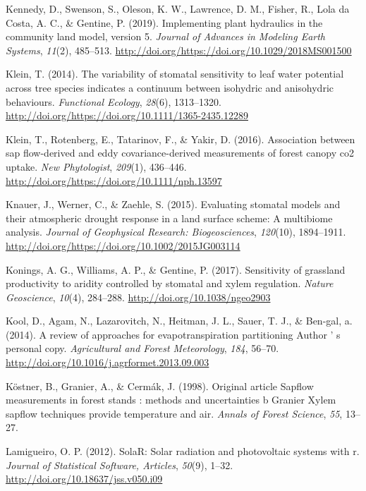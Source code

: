 \documentclass[11pt,twoside]{reedthesis}
\begin{document}
\hypertarget{ref-Kennedy2019}{}
Kennedy, D., Swenson, S., Oleson, K. W., Lawrence, D. M., Fisher, R.,
Lola da Costa, A. C., \& Gentine, P. (2019). Implementing plant
hydraulics in the community land model, version 5. \emph{Journal of
Advances in Modeling Earth Systems}, \emph{11}(2), 485--513.
\url{http://doi.org/https://doi.org/10.1029/2018MS001500}

\hypertarget{ref-Klein2014}{}
Klein, T. (2014). The variability of stomatal sensitivity to leaf water
potential across tree species indicates a continuum between isohydric
and anisohydric behaviours. \emph{Functional Ecology}, \emph{28}(6),
1313--1320. \url{http://doi.org/https://doi.org/10.1111/1365-2435.12289}

\hypertarget{ref-Klein2016}{}
Klein, T., Rotenberg, E., Tatarinov, F., \& Yakir, D. (2016).
Association between sap flow-derived and eddy covariance-derived
measurements of forest canopy co2 uptake. \emph{New Phytologist},
\emph{209}(1), 436--446.
\url{http://doi.org/https://doi.org/10.1111/nph.13597}

\hypertarget{ref-Knauer2015}{}
Knauer, J., Werner, C., \& Zaehle, S. (2015). Evaluating stomatal models
and their atmospheric drought response in a land surface scheme: A
multibiome analysis. \emph{Journal of Geophysical Research:
Biogeosciences}, \emph{120}(10), 1894--1911.
\url{http://doi.org/https://doi.org/10.1002/2015JG003114}

\hypertarget{ref-Konings2017}{}
Konings, A. G., Williams, A. P., \& Gentine, P. (2017). Sensitivity of
grassland productivity to aridity controlled by stomatal and xylem
regulation. \emph{Nature Geoscience}, \emph{10}(4), 284--288.
\url{http://doi.org/10.1038/ngeo2903}

\hypertarget{ref-Kool2014}{}
Kool, D., Agam, N., Lazarovitch, N., Heitman, J. L., Sauer, T. J., \&
Ben-gal, a. (2014). A review of approaches for evapotranspiration
partitioning Author ' s personal copy. \emph{Agricultural and Forest
Meteorology}, \emph{184}, 56--70.
\url{http://doi.org/10.1016/j.agrformet.2013.09.003}

\hypertarget{ref-Kostner1998}{}
Köstner, B., Granier, A., \& Cermák, J. (1998). Original article Sapflow
measurements in forest stands : methods and uncertainties b Granier
Xylem sapflow techniques provide temperature and air. \emph{Annals of
Forest Science}, \emph{55}, 13--27.

\hypertarget{ref-perpinan2012}{}
Lamigueiro, O. P. (2012). SolaR: Solar radiation and photovoltaic
systems with r. \emph{Journal of Statistical Software, Articles},
\emph{50}(9), 1--32. \url{http://doi.org/10.18637/jss.v050.i09}
\end{document}
